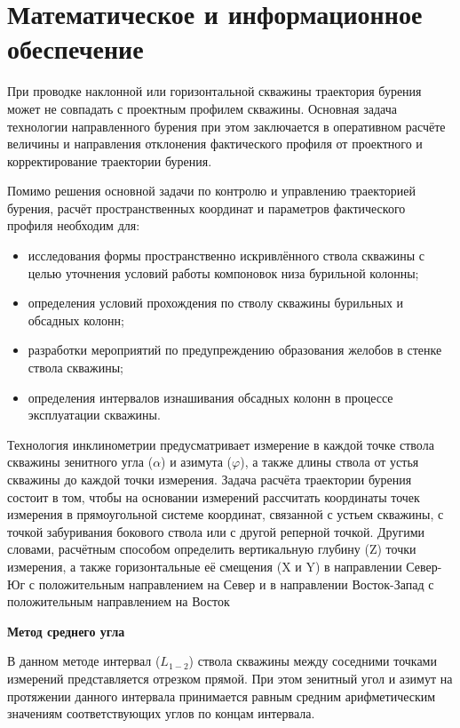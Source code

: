\newpage
\section{Математическое и информационное обеспечение }

При проводке наклонной или горизонтальной скважины траектория бурения может не совпадать с проектным профилем скважины. Основная
задача технологии направленного бурения при этом заключается в оперативном расчёте величины и направления отклонения фактического профиля от
проектного и корректирование траектории бурения.

Помимо решения основной задачи по контролю и управлению траекторией бурения, расчёт пространственных координат и параметров фактического профиля необходим для:
\begin{itemize}
  \item исследования формы пространственно искривлённого ствола скважины с целью уточнения условий работы компоновок низа бурильной колонны;
  \item определения условий прохождения по стволу скважины бурильных и обсадных колонн;
  \item разработки мероприятий по предупреждению образования желобов в стенке ствола скважины;
  \item определения интервалов изнашивания обсадных колонн в процессе эксплуатации скважины.
\end{itemize}

Технология инклинометрии предусматривает измерение в каждой точке ствола скважины зенитного угла ($ \alpha $) и азимута ($ \varphi $), а также длины ствола от
устья скважины до каждой точки измерения. Задача расчёта траектории бурения состоит в том, чтобы на основании измерений рассчитать координаты
точек измерения в прямоугольной системе координат, связанной с устьем скважины, с точкой забуривания бокового ствола или с другой реперной
точкой. Другими словами, расчётным способом определить вертикальную глубину (Z) точки измерения, а также горизонтальные её смещения (X и Y) в
направлении Север-Юг с положительным направлением на Север и в направлении Восток-Запад с положительным направлением на Восток

\textbf{Метод среднего угла}

В данном методе интервал ($ L_{1-2} $) ствола скважины между соседними точками измерений представляется отрезком прямой. При этом зенитный угол
и азимут на протяжении данного интервала принимается равным средним арифметическим значениям соответствующих углов по концам интервала.

